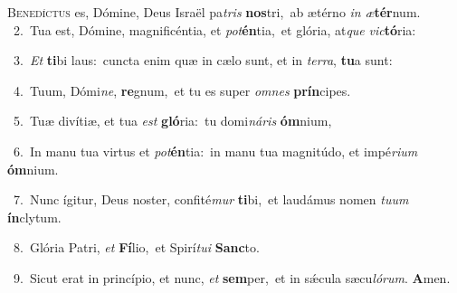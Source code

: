 \lettrine{\initial\textcolor{\initialcolor}{B}}{enedíctus} es, Dómine, Deus Israël pa\textit{tris} \textbf{nos}\-tri,~\star ab ætérno \textit{in} \textit{æ}\-\textbf{tér}num.\\
{\numbfont\textcolor{\numbcolor}{~2.}}~Tua est, Dómine, magnificéntia, et \textit{pot}\-\textbf{én}tia,~\star et glória, at\textit{que} \textit{vic}\-\textbf{tó}ria:\par
{\numbfont\textcolor{\numbcolor}{~3.}}~\textit{Et} \textbf{ti}\-bi laus:~\star cuncta enim quæ in cælo sunt, et in \textit{ter}\-\textit{ra}, \textbf{tu}\-a sunt:\par
{\numbfont\textcolor{\numbcolor}{~4.}}~Tuum, Dómi\-\textit{ne}\-, \textbf{re}\-gnum,~\star et tu es super \textit{om}\-\textit{nes} \textbf{prín}\-cipes.\par
{\numbfont\textcolor{\numbcolor}{~5.}}~Tuæ divítiæ, et tua \textit{est} \textbf{gló}\-ria:~\star tu domi\-\textit{ná}\-\textit{ris} \textbf{óm}\-nium,\par
{\numbfont\textcolor{\numbcolor}{~6.}}~In manu tua virtus et \textit{pot}\-\textbf{én}tia:~\star in manu tua magnitúdo, et impé\-\textit{ri}\-\textit{um} \textbf{óm}\-nium.\par
{\numbfont\textcolor{\numbcolor}{~7.}}~Nunc ígitur, Deus noster, confité\textit{mur} \textbf{ti}\-bi,~\star et laudámus nomen \textit{tu}\-\textit{um} \textbf{ín}\-clytum.\par
{\numbfont\textcolor{\numbcolor}{~8.}}~Glória Patri, \textit{et} \textbf{Fí}\-lio,~\star et Spirí\-\textit{tu}\-\textit{i} \textbf{Sanc}\-to.\par
{\numbfont\textcolor{\numbcolor}{~9.}}~Sicut erat in princípio, et nunc, \textit{et} \textbf{sem}\-per,~\star et in sǽcula sæcu\-\textit{ló}\-\textit{rum}. \textbf{A}\-men.\par

